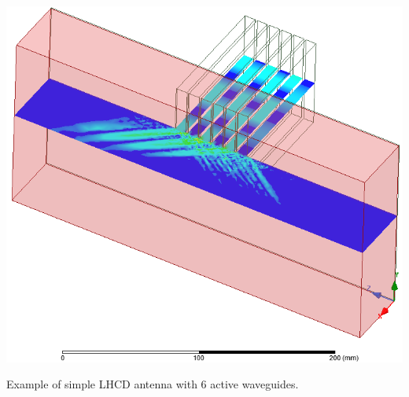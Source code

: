 \begin{marginfigure}
	\centering
	\includegraphics[width=1.0\linewidth]{figures/chap2/LHCD/LH_electric_field}
	\caption{Example of simple LHCD antenna with 6 active waveguides.}
	\label{fig:lhelectricfield}
\end{marginfigure}


